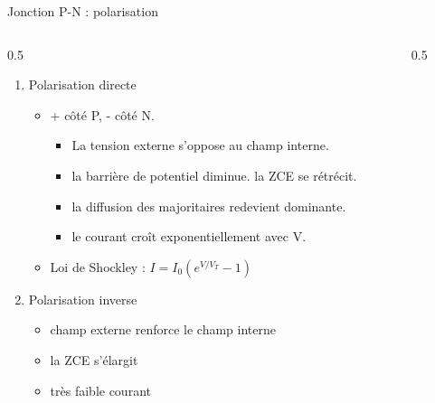 \begin{frame}{Jonction P-N : polarisation}
    \begin{columns}[T]  %
        \begin{column}{0.5\textwidth}  %
          \begin{enumerate}
            \item Polarisation directe
            \begin{itemize}
              \item + côté P, - côté N.
              \begin{itemize}
                \item La tension externe s'oppose au champ interne.
                \item la barrière de potentiel diminue. la ZCE se rétrécit.
                \item la diffusion des majoritaires redevient dominante.
                \item le courant croît exponentiellement avec V.
              \end{itemize}
              \item Loi de Shockley : $I = I_0(e^{V/V_T} - 1)$
            \end{itemize}
            \item Polarisation inverse
            \begin{itemize}
              \item champ externe renforce le champ interne
              \item la ZCE s'élargit
              \item très faible courant
            \end{itemize}
          \end{enumerate}
        \end{column}

        \begin{column}{0.5\textwidth}  %
            \centering
            
        \end{column}
    \end{columns}
\end{frame}

